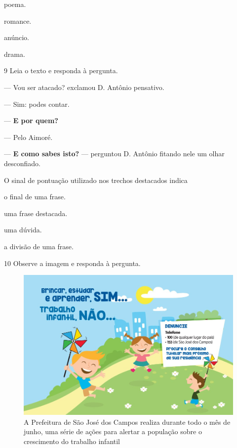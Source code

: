 \begin{escolha}
  \item poema.

  \item romance.

  \item anúncio.

  \item drama.
\end{escolha}

\num{9} Leia o texto e responda à pergunta.

\begin{myquote}
--- Vou ser atacado? exclamou D. Antônio pensativo.

--- Sim: podes contar.

--- \textbf{E por quem?}

--- Pelo Aimoré.

--- \textbf{E como sabes isto?} --- perguntou D. Antônio fitando nele um olhar
desconfiado.

\end{myquote}

O sinal de pontuação utilizado nos trechos destacados indica

\begin{escolha}
  \item o final de uma frase.

  \item uma frase destacada.

  \item uma dúvida.

  \item a divisão de uma frase.
\end{escolha} 

\num{10} Observe a imagem e responda à pergunta.

\begin{figure}
\includegraphics[width=\textwidth]{./imgQ4PORT/media/image1.jpeg}
\caption{A Prefeitura de São José dos Campos realiza durante todo o mês
de junho, uma série de ações para alertar a população sobre o
crescimento do trabalho infantil}
\end{figure}

